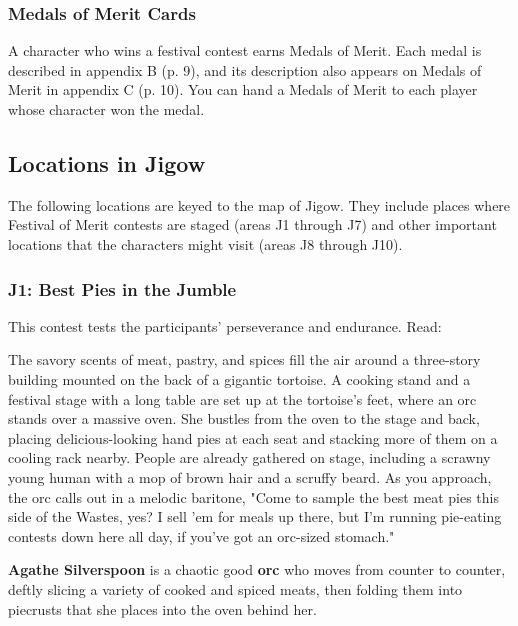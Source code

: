 \documentclass[letterpaper, 11pt, bg=full, twocolumn]{dndbook}
\begin{document}
\subsubsection{Medals of Merit Cards}

A character who wins a festival contest earns Medals of Merit. Each medal is described in appendix B (p. 9), and its description also appears on Medals of Merit in appendix C (p. 10). You can hand a Medals of Merit to each player whose character won the medal.

\subsection{Locations in Jigow}

The following locations are keyed to the map of Jigow. They include places where Festival of Merit contests are staged (areas J1 through J7) and other important locations that the characters might visit (areas J8 through J10).



\subsubsection{J1: Best Pies in the Jumble}

This contest tests the participants' perseverance and endurance. Read:

\begin{DndReadAloud}
The savory scents of meat, pastry, and spices fill the air around a three-story building mounted on the back of a gigantic tortoise. A cooking stand and a festival stage with a long table are set up at the tortoise's feet, where an orc stands over a massive oven. She bustles from the oven to the stage and back, placing delicious-looking hand pies at each seat and stacking more of them on a cooling rack nearby.
People are already gathered on stage, including a scrawny young human with a mop of brown hair and a scruffy beard. As you approach, the orc calls out in a melodic baritone, "Come to sample the best meat pies this side of the Wastes, yes? I sell 'em for meals up there, but I'm running pie-eating contests down here all day, if you've got an orc-sized stomach."
\end{DndReadAloud}

\textbf{Agathe Silverspoon} is a chaotic good \textbf{orc} who moves from counter to counter, deftly slicing a variety of cooked and spiced meats, then folding them into piecrusts that she places into the oven behind her.
\end{document}
